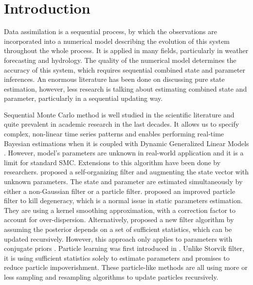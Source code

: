 
\section{Introduction}

Data assimilation is a sequential process, by which the observations are incorporated into a numerical model describing the evolution of this system throughout the whole process. It is applied in many fields, particularly in weather forecasting and hydrology. The quality of the numerical model determines the accuracy of this system, which requires sequential combined state and parameter inferences. An enormous literature has been done on discussing pure state estimation, however, less research is talking about estimating combined state and parameter, particularly in a sequential updating way. 

Sequential Monte Carlo method is well studied in the scientific literature and quite prevalent in academic research in the last decades. It allows us to specify complex, non-linear time series patterns and enables performing real-time Bayesian estimations when it is coupled with Dynamic Generalized Linear Models \cite{vieira2016online}. However, model's parameters are unknown in real-world application and it is a limit for standard SMC. Extensions to this algorithm have been done by researchers. \cite{kitagawa1998self} proposed a self-organizing filter and augmenting the state vector with unknown parameters. The state and parameter are estimated simultaneously by either a non-Gaussian filter or a particle filter. \cite{liu2001combined} proposed an improved particle filter to kill degeneracy, which is a normal issue in static parameters estimation. They are using a kernel smoothing approximation, with a correction factor to account for over-dispersion. Alternatively, \cite{storvik2002particle} proposed a new filter algorithm by assuming the posterior depends on a set of sufficient statistics, which can be updated recursively. However, this approach only applies to parameters with conjugate priors \cite{stroud2016bayesian}. Particle learning was first introduced in \cite{carvalho2010particle}. Unlike Storvik filter, it is using sufficient statistics solely to estimate parameters and promises to reduce particle impoverishment. These particle-like methods are all using more or less sampling and resampling algorithms to update particles recursively. 

